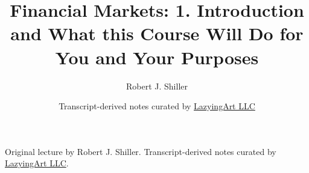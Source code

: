 \documentclass[11pt,oneside]{book}
\begin{document}
\frontmatter
\title{Financial Markets: 1. Introduction and What this Course Will Do for You and Your Purposes}
\author{Robert J. Shiller}
\date{Transcript-derived notes curated by \href{https://lazying.art}{LazyingArt LLC}}
\maketitle
\begin{center}
\small Original lecture by Robert J. Shiller. Transcript-derived notes curated by \href{https://lazying.art}{LazyingArt LLC}.
\end{center}
\clearpage
\mainmatter

\end{document}
